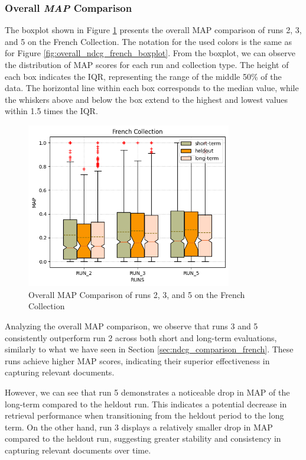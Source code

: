 \subsubsection{Overall \textit{MAP} Comparison} \label{sec:map_comparison_french}
The boxplot shown in Figure \ref{fig:map_french} presents the overall \ac{MAP} comparison of runs 2, 3, and 5 on the French Collection.
The notation for the used colors is the same as for Figure \ref{fig:overall_ndcg_french_boxplot}.
From the boxplot, we can observe the distribution of \ac{MAP} scores for each run and collection type. The height of each box indicates the \ac{IQR}, representing the range of the middle 50\% of the data. 
The horizontal line within each box corresponds to the median value, while the whiskers above and below the box extend to the highest and lowest values within 1.5 times the \ac{IQR}.

\begin{figure}[!h]
    \centering
    \includegraphics[width=0.8\textwidth]{figure/StatisticalAnalysis/BoxPlot/MAP French.png}
    \caption{Overall MAP Comparison of runs 2, 3, and 5 on the French Collection}
    \label{fig:map_french}
\end{figure}

Analyzing the overall \ac{MAP} comparison, we observe that runs 3 and 5 consistently outperform run 2 across both short and long-term evaluations, similarly to what we have seen in Section \ref{sec:ndcg_comparison_french}.
These runs achieve higher \ac{MAP} scores, indicating their superior effectiveness in capturing relevant documents.  

However, we can see that run 5 demonstrates a noticeable drop in \ac{MAP} of the long-term compared to the heldout run. 
This indicates a potential decrease in retrieval performance when transitioning from the heldout period to the long term. 
On the other hand, run 3 displays a relatively smaller drop in \ac{MAP} compared to the heldout run, suggesting greater stability and consistency in capturing relevant documents over time.

